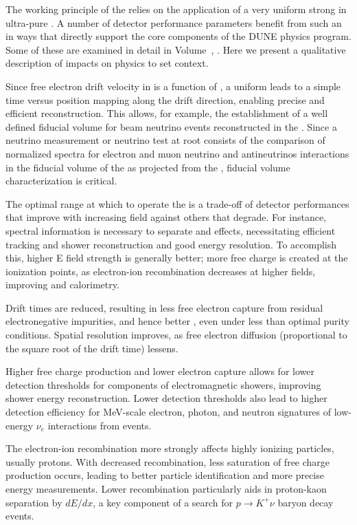 The working principle of the  relies on the application of a very uniform strong \efield in ultra-pure .  A number of detector performance parameters benefit from such an \efield in ways that directly support the core components of the DUNE physics program.  Some of these are examined in detail in Volume~\volnumberphysics{}, \voltitlephysics{}.  Here we present a qualitative description of \efield impacts on physics to set context.

Since free electron drift velocity in  is a function of \efield, a uniform \efield leads to a simple time versus position mapping along the drift direction, enabling precise and efficient \threed reconstruction.  This allows, for example, the establishment of a well defined fiducial volume for beam neutrino events reconstructed in the .  Since a neutrino  measurement or neutrino  test at root consists of the comparison of normalized spectra for electron and muon neutrino and antineutrinos interactions in the fiducial volume of the  as projected from the , fiducial volume characterization is critical.   

The optimal \efield range at which to operate the  is a trade-off  of detector performances that improve with increasing field against others that degrade. For instance, spectral information is necessary to separate  and  effects, necessitating efficient tracking and shower reconstruction and good energy resolution. To accomplish this, higher E field strength is generally better; more free charge is created at the ionization points, as electron-ion recombination decreases at higher fields, improving  and calorimetry. 


Drift times are reduced, resulting in less free electron capture from residual electronegative impurities, and hence better , even under less than optimal purity conditions.  Spatial resolution improves, as free electron diffusion (proportional to the square root of the drift time) lessens. 

Higher free charge production and lower electron capture allows for lower detection thresholds for components of electromagnetic showers, improving shower energy reconstruction. Lower detection thresholds also lead to higher detection efficiency for MeV-scale electron, photon, and neutron signatures of low-energy $\nu_e$ interactions from  events.  

The electron-ion recombination more strongly affects highly ionizing particles, usually protons.  With decreased recombination, less saturation of free charge production occurs,  leading to better particle identification and more precise energy measurements.  Lower recombination particularly aids in proton-kaon separation by $dE/dx$, a key component of a search for $p\rightarrow K^+ \nu$ baryon decay events. 

